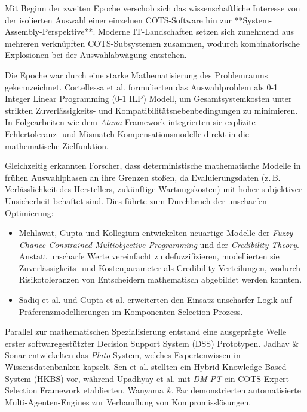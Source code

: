 Mit Beginn der zweiten Epoche verschob sich das wissenschaftliche Interesse von der isolierten Auswahl einer einzelnen COTS-Software hin zur **System-Assembly-Perspektive**. Moderne IT-Landschaften setzen sich zunehmend aus mehreren verknüpften COTS-Subsystemen zusammen, wodurch kombinatorische Explosionen bei der Auswahlabwägung entstehen.

Die Epoche war durch eine starke Mathematisierung des Problemraums gekennzeichnet. Cortellessa et al. \cite{VUVLUN85} formulierten das Auswahlproblem als 0-1 Integer Linear Programming (0-1 ILP) Modell, um Gesamtsystemkosten unter strikten Zuverlässigkeits- und Kompatibilitätsnebenbedingungen zu minimieren. In Folgearbeiten wie dem \textit{Atana}-Framework \cite{MZ8JHDYA} integrierten sie explizite Fehlertoleranz- und Mismatch-Kompensationsmodelle direkt in die mathematische Zielfunktion.

Gleichzeitig erkannten Forscher, dass deterministische mathematische Modelle in frühen Auswahlphasen an ihre Grenzen stoßen, da Evaluierungsdaten (z.\,B. Verlässlichkeit des Herstellers, zukünftige Wartungskosten) mit hoher subjektiver Unsicherheit behaftet sind. Dies führte zum Durchbruch der unscharfen Optimierung:
\begin{itemize}
    \item Mehlawat, Gupta und Kollegium \cite{6YJHIVHG, B7ZTQCZZ, JX4RDRDU} entwickelten neuartige Modelle der \textit{Fuzzy Chance-Constrained Multiobjective Programming} und der \textit{Credibility Theory}. Anstatt unscharfe Werte vereinfacht zu defuzzifizieren, modellierten sie Zuverlässigkeits- und Kostenparameter als Credibility-Verteilungen, wodurch Risikotoleranzen von Entscheidern mathematisch abgebildet werden konnten.
    \item Sadiq et al. \cite{P9SATBH5} und Gupta et al. \cite{VRTXHQI7} erweiterten den Einsatz unscharfer Logik auf Präferenzmodellierungen im Komponenten-Selection-Prozess.
\end{itemize}

Parallel zur mathematischen Spezialisierung entstand eine ausgeprägte Welle erster softwaregestützter Decision Support System (DSS) Prototypen. Jadhav \& Sonar \cite{CI86GRRG, 8VHUMEKY} entwickelten das \textit{Plato}-System, welches Expertenwissen in Wissensdatenbanken kapselt. Sen et al. \cite{U4E7VXQU} stellten ein Hybrid Knowledge-Based System (HKBS) vor, während Upadhyay et al. \cite{WZM7DUBY} mit \textit{DM-PT} ein COTS Expert Selection Framework etablierten. Wanyama \& Far \cite{WBGP3ETU} demonstrierten automatisierte Multi-Agenten-Engines zur Verhandlung von Kompromisslösungen.

